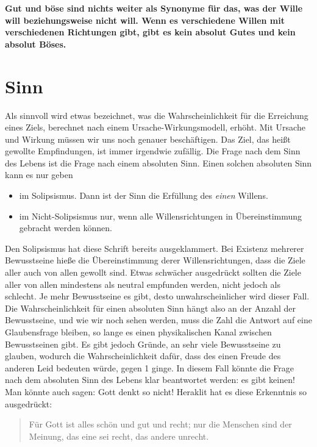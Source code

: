 \documentclass[12pt]{book}
\begin{document}
\textbf{Gut und böse sind nichts weiter als Synonyme für das, was der Wille will beziehungsweise nicht will. Wenn es verschiedene Willen mit verschiedenen Richtungen gibt, gibt es kein absolut Gutes und kein absolut Böses.}

\section{Sinn}

Als sinnvoll wird etwas bezeichnet, was die Wahrscheinlichkeit für die Erreichung eines Ziels, berechnet nach einem Ursache-Wirkungsmodell, erhöht. Mit Ursache und Wirkung müssen wir uns noch genauer beschäftigen. Das Ziel, das heißt gewollte Empfindungen, ist immer irgendwie zufällig. Die Frage nach dem Sinn des Lebens ist die Frage nach einem absoluten Sinn. Einen solchen absoluten Sinn kann es nur geben
\begin{itemize}
\item im Solipsismus. Dann ist der Sinn die Erfüllung des \emph{einen} Willens.
\item im Nicht-Solipsismus nur, wenn alle Willensrichtungen in Übereinstimmung gebracht werden können.
\end{itemize}
Den Solipsismus hat diese Schrift bereits ausgeklammert. Bei Existenz mehrerer Bewusstseine hieße die Übereinstimmung derer Willensrichtungen, dass die Ziele aller auch von allen gewollt sind. Etwas schwächer ausgedrückt sollten die Ziele aller von allen mindestens als neutral empfunden werden, nicht jedoch als schlecht. Je mehr Bewusstseine es gibt, desto unwahrscheinlicher wird dieser Fall. Die Wahrscheinlichkeit für einen absoluten Sinn hängt also an der Anzahl der Bewusstseine, und wie wir noch sehen werden, muss die Zahl die Antwort auf eine Glaubensfrage bleiben, so lange es einen physikalischen Kanal zwischen Bewusstseinen gibt. Es gibt jedoch Gründe, an sehr viele Bewusstseine zu glauben, wodurch die Wahrscheinlichkeit dafür, dass des einen Freude des anderen Leid bedeuten würde, gegen 1 ginge. In diesem Fall könnte die Frage nach dem absoluten Sinn des Lebens klar beantwortet werden: es gibt keinen! Man könnte auch sagen: Gott denkt so nicht! Heraklit hat es diese Erkenntnis so ausgedrückt: 
\begin{quote}\begin{tcolorbox}
Für Gott ist alles schön und gut und recht; nur die Menschen sind der Meinung, das eine sei recht, das andere unrecht.
\end{tcolorbox}\end{quote}
\end{document}
